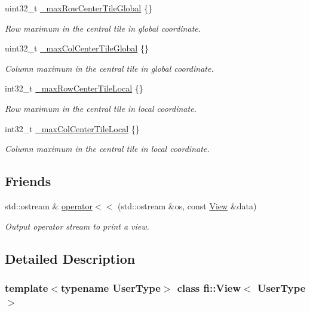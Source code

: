 \begin{DoxyCompactItemize}
uint32\+\_\+t \hyperlink{classfi_1_1View_add201fdbd6c6975e38ae826e11afaa78}{\+\_\+max\+Row\+Center\+Tile\+Global} \{\}
\begin{DoxyCompactList}\small\item\em Row maximum in the central tile in global coordinate. \end{DoxyCompactList}\item 
uint32\+\_\+t \hyperlink{classfi_1_1View_a97df6aed1697d0a729fe0fc051fd8bcc}{\+\_\+max\+Col\+Center\+Tile\+Global} \{\}
\begin{DoxyCompactList}\small\item\em Column maximum in the central tile in global coordinate. \end{DoxyCompactList}\item 
int32\+\_\+t \hyperlink{classfi_1_1View_aadafc4e11a0a12776eb0d5dd776dfab7}{\+\_\+max\+Row\+Center\+Tile\+Local} \{\}
\begin{DoxyCompactList}\small\item\em Row maximum in the central tile in local coordinate. \end{DoxyCompactList}\item 
int32\+\_\+t \hyperlink{classfi_1_1View_ab13cc15a780703ce9854a3a01f744f89}{\+\_\+max\+Col\+Center\+Tile\+Local} \{\}
\begin{DoxyCompactList}\small\item\em Column maximum in the central tile in local coordinate. \end{DoxyCompactList}\end{DoxyCompactItemize}
\subsection*{Friends}
\begin{DoxyCompactItemize}
\item 
std\+::ostream \& \hyperlink{classfi_1_1View_a80b5a6c2350a5cdc15eef29a0ab11035}{operator$<$$<$} (std\+::ostream \&os, const \hyperlink{classfi_1_1View}{View} \&data)
\begin{DoxyCompactList}\small\item\em Output operator stream to print a view. \end{DoxyCompactList}\end{DoxyCompactItemize}


\subsection{Detailed Description}
\subsubsection*{template$<$typename User\+Type$>$\newline
class fi\+::\+View$<$ User\+Type $>$}

